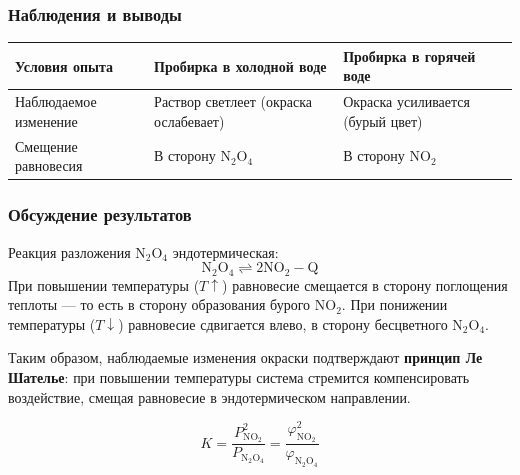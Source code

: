 \documentclass[a4paper,12pt]{article}
\begin{document}
	\subsubsection*{Наблюдения и выводы}
	
	\begin{center}
		\renewcommand{\arraystretch}{1.3}
		\setlength{\extrarowheight}{2pt}
		\begin{tabularx}{0.9\textwidth}{|>{\raggedright\arraybackslash}X|
				>{\centering\arraybackslash}m{4cm}|
				>{\centering\arraybackslash}m{4cm}|}
			\hline
			\textbf{Условия опыта} &
			\textbf{Пробирка в холодной воде} &
			\textbf{Пробирка в горячей воде} \\ \hline
			Наблюдаемое изменение &
			Раствор светлеет (окраска ослабевает) &
			Окраска усиливается (бурый цвет) \\ \hline
			Смещение равновесия &
			В сторону \(\mathrm{N_2O_4}\) &
			В сторону \(\mathrm{NO_2}\) \\ \hline
		\end{tabularx}
	\end{center}
	
	\subsubsection*{Обсуждение результатов}
	
	Реакция разложения \(\mathrm{N_2O_4}\) эндотермическая:
	\[
	\mathrm{N_2O_4 \rightleftharpoons 2NO_2 - Q}
	\]
	При повышении температуры (\(T \uparrow\)) равновесие смещается в сторону поглощения теплоты — то есть в сторону образования бурого \(\mathrm{NO_2}\).  
	При понижении температуры (\(T \downarrow\)) равновесие сдвигается влево, в сторону бесцветного \(\mathrm{N_2O_4}\).
	
	Таким образом, наблюдаемые изменения окраски подтверждают \textbf{принцип Ле Шателье}: при повышении температуры система стремится компенсировать воздействие, смещая равновесие в эндотермическом направлении.
	
	\begin{center}
		\[
		K = \frac{P^2_{\mathrm{NO_2}}}{P_{\mathrm{N_2O_4}}}
		= \frac{\varphi^2_{\mathrm{NO_2}}}{\varphi_{\mathrm{N_2O_4}}}
		\]
	\end{center}
	
\end{document}
